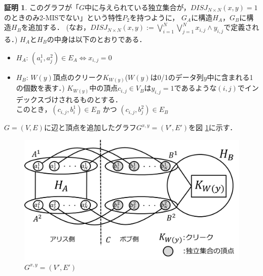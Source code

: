 \documentclass[12pt]{thesis}
\theoremstyle{definition}
\newtheorem*{prf*}{証明}
\begin{document}
\begin{prf*}
このグラフが「$G$中に与えられている独立集合が，$DISJ_{N \times N} (x, y) = 1$のときのみ2-MISでない」という特性$P_{2}$を持つように，
$G_{A}$に構造$H_{A}$，$G_{B}$に構造$H_{B}$を追加する．
(なお，$DISJ_{N \times N} (x, y) :=\bigvee_{i = 1}^{N} \bigvee_{j = 1}^{N} x_{i, j} \land y_{i, j}$で定義される．)
$H_{A}$と$H_{B}$の中身は以下のとおりである．

\newpage
\begin{itemize}
\item $H_{A}$: $(a_{i}^{1}, a_{j}^{2}) \in E_{A} \Leftrightarrow x_{i, j} = 0$
\item $H_{B}$: $W(y)$頂点のクリーク$K_{W(y)}$($W(y)$は0/1のデータ列$y$中に含まれる1の個数を表す．)
$K_{W(y)}$中の頂点$c_{i, j} \in V_{B}$は$y_{i, j} = 1$であるような$(i, j)$でインデックスづけされるものとする． \\
このとき，$(c_{i, j}, b_{i}^{1}) \in E_{B}$ かつ $(c_{i, j}, b_{j}^{2}) \in E_{B}$
\end{itemize}

$G = (V, E)$に辺と頂点を追加したグラフ$G^{x, y} = (V', E')$を図 \ref{2_G(x,y)}に示す．

\begin{figure}[ht]
\begin{center}
\includegraphics[width=120mm]{2_Gxy.png}
\end{center}
\caption{$G^{x, y} = (V', E')$}
\label{2_G(x,y)}
\end{figure}


\end{prf*}
\end{document}
